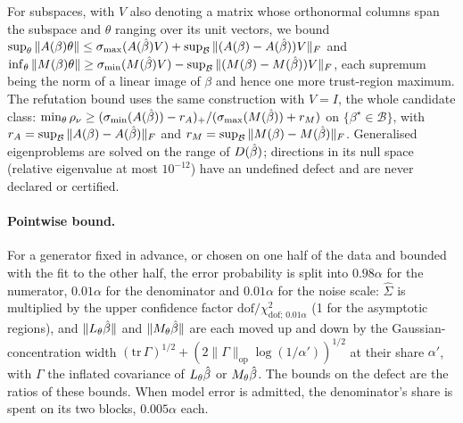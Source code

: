 For subspaces, with $V$ also denoting a matrix whose orthonormal columns span
the subspace and $\theta$ ranging over its unit vectors, we bound
$\sup_{\theta}\|A(\beta)\theta\| \le
\sigma_{\max}(A(\hat{\beta})V) + \sup_{\mathcal B}\|(A(\beta)-A(\hat{\beta}))V\|_F$ and
$\inf_{\theta}\|M(\beta)\theta\| \ge \sigma_{\min}(M(\hat{\beta})V) -
\sup_{\mathcal B}\|(M(\beta)-M(\hat{\beta}))V\|_F$, each supremum being the norm of a
linear image of $\beta$ and hence one more trust-region maximum. The refutation
bound uses the same construction with $V = I$, the whole candidate class:
$\min_\theta\rho_\nu \ge (\sigma_{\min}(A(\hat{\beta})) - r_A)_+ /
(\sigma_{\max}(M(\hat{\beta})) + r_M)$ on $\{\beta^\star \in \mathcal B\}$, with $r_A =
\sup_{\mathcal B}\|A(\beta)-A(\hat{\beta})\|_F$ and $r_M = \sup_{\mathcal
B}\|M(\beta)-M(\hat{\beta})\|_F$. Generalised eigenproblems are solved on the range
of $D(\hat{\beta})$; directions in its null space (relative eigenvalue at most
$10^{-12}$) have an undefined defect and are never declared or certified.

\paragraph{Pointwise bound.} For a generator fixed in advance, or chosen on
one half of the data and bounded with the fit to the other half, the error
probability is split into $0.98\alpha$ for the numerator, $0.01\alpha$ for the
denominator and $0.01\alpha$ for the noise scale: $\hat\Sigma$ is multiplied by
the upper confidence factor $\mathrm{dof}/\chi^2_{\mathrm{dof};\,0.01\alpha}$
(1 for the asymptotic regions), and $\|L_\theta\hat{\beta}\|$ and $\|M_\theta\hat{\beta}\|$ are each moved up and down by
the Gaussian-concentration width $(\mathrm{tr}\,\Gamma)^{1/2} +
(2\|\Gamma\|_{\mathrm{op}}\log(1/\alpha'))^{1/2}$ at their share $\alpha'$,
with $\Gamma$ the inflated covariance of $L_\theta\hat{\beta}$ or $M_\theta\hat{\beta}$.
The bounds on the defect are the ratios of these bounds. When model error is
admitted, the denominator's share is spent on its two blocks, $0.005\alpha$
each.

